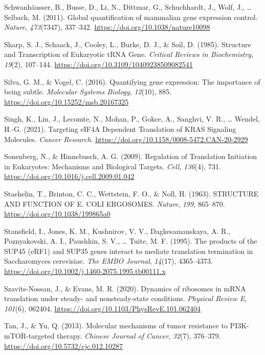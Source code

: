\documentclass[12pt,openany]{book}
\begin{document}
\hypertarget{ref-Schwanhausser2011}{}
Schwanhäusser, B., Busse, D., Li, N., Dittmar, G., Schuchhardt, J.,
Wolf, J., \ldots{} Selbach, M. (2011). Global quantification of
mammalian gene expression control. \emph{Nature}, \emph{473}(7347),
337--342. \url{https://doi.org/10.1038/nature10098}

\hypertarget{ref-Sharp1985}{}
Sharp, S. J., Schaack, J., Cooley, L., Burke, D. J., \& Soil, D. (1985).
Structure and Transcription of Eukaryotic tRNA Gene. \emph{Critical
Reviews in Biochemistry}, \emph{19}(2), 107--144.
\url{https://doi.org/10.3109/10409238509082541}

\hypertarget{ref-Silva2016}{}
Silva, G. M., \& Vogel, C. (2016). Quantifying gene expression: The
importance of being subtle. \emph{Molecular Systems Biology},
\emph{12}(10), 885. \url{https://doi.org/10.15252/msb.20167325}

\hypertarget{ref-Singh2021}{}
Singh, K., Lin, J., Lecomte, N., Mohan, P., Gokce, A., Sanghvi, V. R.,
\ldots{} Wendel, H.-G. (2021). Targeting eIF4A Dependent Translation of
KRAS Signaling Molecules. \emph{Cancer Research}.
\url{https://doi.org/10.1158/0008-5472.CAN-20-2929}

\hypertarget{ref-Sonenberg2009}{}
Sonenberg, N., \& Hinnebusch, A. G. (2009). Regulation of Translation
Initiation in Eukaryotes: Mechanisms and Biological Targets.
\emph{Cell}, \emph{136}(4), 731.
\url{https://doi.org/10.1016/j.cell.2009.01.042}

\hypertarget{ref-Staehelin1963a}{}
Staehelin, T., Brinton, C. C., Wettstein, F. O., \& Noll, H. (1963).
STRUCTURE AND FUNCTION OF E. COLI ERGOSOMES. \emph{Nature}, \emph{199},
865--870. \url{https://doi.org/10.1038/199865a0}

\hypertarget{ref-Stansfield1995}{}
Stansfield, I., Jones, K. M., Kushnirov, V. V., Dagkesamanskaya, A. R.,
Poznyakovski, A. I., Paushkin, S. V., \ldots{} Tuite, M. F. (1995). The
products of the SUP45 (eRF1) and SUP35 genes interact to mediate
translation termination in Saccharomyces cerevisiae. \emph{The EMBO
Journal}, \emph{14}(17), 4365--4373.
\url{https://doi.org/10.1002/j.1460-2075.1995.tb00111.x}

\hypertarget{ref-Szavits-Nossan2020b}{}
Szavits-Nossan, J., \& Evans, M. R. (2020). Dynamics of ribosomes in
mRNA translation under steady- and nonsteady-state conditions.
\emph{Physical Review E}, \emph{101}(6), 062404.
\url{https://doi.org/10.1103/PhysRevE.101.062404}

\hypertarget{ref-Tan2013}{}
Tan, J., \& Yu, Q. (2013). Molecular mechanisms of tumor resistance to
PI3K-mTOR-targeted therapy. \emph{Chinese Journal of Cancer},
\emph{32}(7), 376--379. \url{https://doi.org/10.5732/cjc.012.10287}
\end{document}
